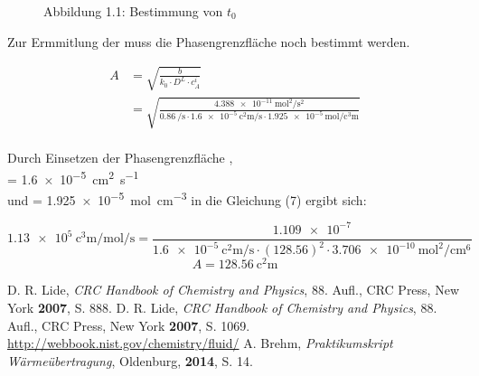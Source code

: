 \documentclass{article}
\begin{document}
\begin{onehalfspace}
\begin{figure}[htbp!]
\caption*{Abbildung 1.1: Bestimmung von $t_0$ }

\end{figure}

Zur Ermmitlung der  muss die Phasengrenzfläche  noch bestimmt werden.

\begin{align}
  A &= \sqrt{\frac{b}{k_0 \cdot D^L \cdot c_A^i}} \\
    &= \sqrt{\frac{\SI{4.388e-11}{\square\mol\per\square\second}}{\SI{0.86}{\per\second} \cdot \SI{1.6e-5}{\square\centi\meter\per\second} \cdot \SI{1.925e-5}{\mol\per\cubic\centi\meter} }}\\
\end{align}

Durch Einsetzen der Phasengrenzfläche , \\
 = \SI{1.6e-5}{\square\centi\meter\per\second} \\
und  = \SI{1.925e-5}{\mol\per\cubic\centi\meter} in die Gleichung (7) ergibt sich:

\begin{equation}
 \SI{1.13e5}{\cubic\centi\meter\per\mol\per\second}=\frac{\num{1.109e-7}}{\SI{1.6e-5}{\square\centi\meter\per\second} \cdot (128.56)^2 \cdot \SI{3.706e-10}{\square\mol\per\centi\meter\tothe{6}} }
\end{equation}
\begin{equation}
  A = \SI{128.56}{\square\centi\meter}
\end{equation}

\begin{thebibliography}{}
D. R. Lide, \textit{CRC Handbook of Chemistry and Physics}, 88. Aufl., CRC Press, New York \textbf{2007}, S. 888.
D. R. Lide, \textit{CRC Handbook of Chemistry and Physics}, 88. Aufl., CRC Press, New York \textbf{2007}, S. 1069.
\url{http://webbook.nist.gov/chemistry/fluid/}
A. Brehm, \textit{Praktikumskript Wärmeübertragung}, Oldenburg, \textbf{2014},  S. 14.
\end{thebibliography}
\end{onehalfspace}
\end{document}
